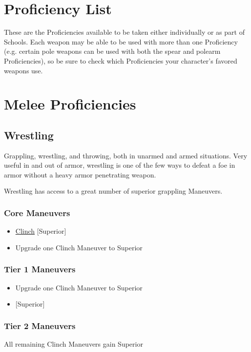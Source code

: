 \documentclass[oneside,11pt,english]{book}
\begin{document}
\section*{Proficiency List}
These are the Proficiencies available to be taken either individually or as part of Schools. Each weapon 
may be able to be used with more than one Proficiency (e.g. certain pole weapons can be used with both 
the spear and polearm Proficiencies), so be sure to check which Proficiencies your character’s favored weapons use.

\section{Melee Proficiencies}
\subsection{Wrestling}
Grappling, wrestling, and throwing, both in unarmed and armed situations. Very useful in and out of armor, wrestling is one of the few ways to defeat a foe in armor without a heavy armor penetrating weapon.

Wrestling has access to a great number of superior grappling Maneuvers. 

\subsubsection{Core Maneuvers}
\vspace{-5pt}\begin{itemize}
	[itemsep=0.5mm]
	\item \hyperref[man:Clinch (Attack)]{Clinch} [Superior]
	\item Upgrade one Clinch Maneuver to Superior
\end{itemize}
\subsubsection{Tier 1 Maneuvers}
\vspace{-5pt}\begin{itemize}
	[itemsep=0.5mm]
	\item Upgrade one Clinch Maneuver to Superior
	\item {} [Superior]
\end{itemize}
\subsubsection{Tier 2 Maneuvers}
All remaining Clinch Maneuvers gain Superior
\end{document}

